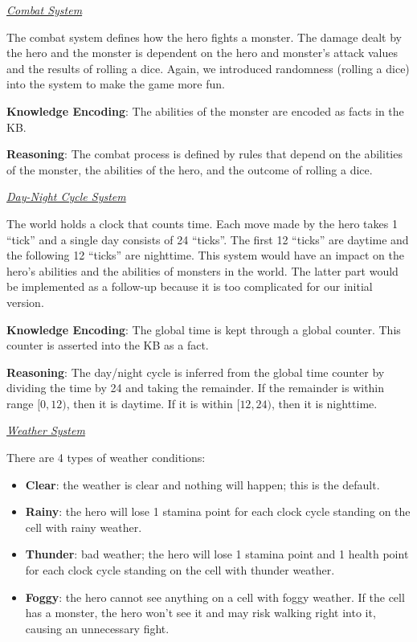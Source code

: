 \documentclass[9pt]{article}
\begin{document}
\begin{multicols*}{2}
\textit{\underline{Combat System}}

The combat system defines how the hero fights a monster. The damage dealt by the hero and the monster is dependent on the hero and monster’s attack values and the results of rolling a dice. Again, we introduced randomness (rolling a dice) into the system to make the game more fun.

\textbf{Knowledge Encoding}: The abilities of the monster are encoded as facts in the KB.

\textbf{Reasoning}: The combat process is defined by rules that depend on the abilities of the monster, the abilities of the hero, and the outcome of rolling a dice.


\textit{\underline{Day-Night Cycle System}}

The world holds a clock that counts time. Each move made by the hero takes 1 “tick” and a single day consists of 24 “ticks”. The first 12 “ticks” are daytime and the following 12 “ticks” are nighttime. This system would have an impact on the hero’s abilities and the abilities of monsters in the world. The latter part would be implemented as a follow-up because it is too complicated for our initial version.

\textbf{Knowledge Encoding}: The global time is kept through a global counter. This counter is asserted into the KB as a fact.

\textbf{Reasoning}: The day/night cycle is inferred from the global time counter by dividing the time by 24 and taking the remainder. If the remainder is within range $[0,12)$, then it is daytime. If it is within $[12,24)$, then it is nighttime.


\textit{\underline{Weather System}}

There are 4 types of weather conditions:
\begin{itemize}
\item \textbf{Clear}: the weather is clear and nothing will happen; this is the default.
\item \textbf{Rainy}: the hero will lose 1 stamina point for each clock cycle standing on the cell with rainy weather.
\item \textbf{Thunder}: bad weather; the hero will lose 1 stamina point and 1 health point for each clock cycle standing on the cell with thunder weather.
\item \textbf{Foggy}: the hero cannot see anything on a cell with foggy weather. If the cell has a monster, the hero won’t see it and may risk walking right into it, causing an unnecessary fight.
\end{itemize}


\end{multicols*}
\end{document}
